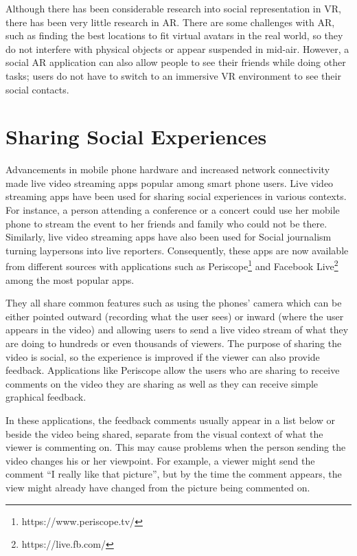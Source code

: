 Although there has been considerable research into social representation in VR, there has been very little research in AR. There are some challenges with AR, such as finding the best locations to fit virtual avatars in the real world, so they do not interfere with physical objects or appear suspended in mid-air. However, a social AR application can also allow people to see their friends while doing other tasks; users do not have to switch to an immersive VR environment to see their social contacts.

\section{Sharing Social Experiences}

Advancements in mobile phone hardware and increased network connectivity made live video streaming apps popular among smart phone users. Live video streaming apps have been used for sharing social experiences in various contexts. For instance, a person attending a conference or a concert could use her mobile phone to stream the event to her friends and family who could not be there. Similarly, live video streaming apps have also been used for Social journalism turning laypersons into live reporters. Consequently, these apps are now available from different sources with applications such as Periscope\footnote{https://www.periscope.tv/} and Facebook Live\footnote{https://live.fb.com/} among the most popular apps. 

They all share common features such as using the phones' camera which can be either pointed outward (recording what the user sees) or inward (where the user appears in the video) and allowing users to send a live video stream of what they are doing to hundreds or even thousands of viewers. The purpose of sharing the video is social, so the experience is improved if the viewer can also provide feedback. Applications like Periscope allow the users who are sharing to receive comments on the video they are sharing as well as they can receive simple graphical feedback. 

In these applications, the feedback comments usually appear in a list below or beside the video being shared, separate from the visual context of what the viewer is commenting on. This may cause problems when the person sending the video changes his or her viewpoint. For example, a viewer might send the comment “I really like that picture”, but by the time the comment appears, the view might already have changed from the picture being commented on.


